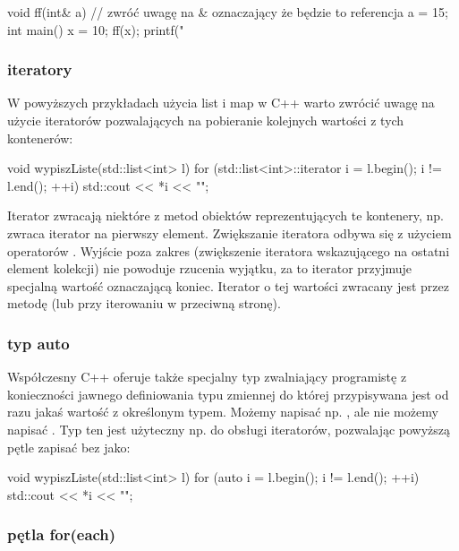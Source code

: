 \begin{CodeFrame*}[cpp]{}
void ff(int& a) { // zwróć uwagę na & oznaczający że będzie to referencja
    a = 15;
}
int main() {
    x = 10;
    ff(x);
    printf("%
}
\end{CodeFrame*}

\subsubsection{iteratory}

W powyższych przykładach użycia list i map w C++ warto zwrócić uwagę na użycie iteratorów pozwalających na pobieranie kolejnych wartości z tych kontenerów:

\begin{CodeFrame*}[cpp]{}
void wypiszListe(std::list<int> l) {
    for (std::list<int>::iterator i = l.begin(); i != l.end(); ++i) {
        std::cout << *i << "\n";
    }
}
\end{CodeFrame*}

Iterator zwracają niektóre z metod obiektów reprezentujących te kontenery, np.  zwraca iterator na pierwszy element.
Zwiększanie iteratora odbywa się z użyciem operatorów \cpp{++}.
Wyjście poza zakres (zwiększenie iteratora wskazującego na ostatni element kolekcji) nie powoduje rzucenia wyjątku, za to iterator przyjmuje specjalną wartość oznaczającą koniec.
Iterator o tej wartości zwracany jest przez metodę  (lub  przy iterowaniu w przeciwną stronę).

\subsubsection{typ auto}

Współczesny C++ oferuje także specjalny typ  zwalniający programistę z konieczności jawnego definiowania typu zmiennej do której przypisywana jest od razu jakaś wartość z określonym typem. Możemy napisać np. , ale nie możemy napisać . Typ ten jest użyteczny np. do obsługi iteratorów, pozwalając powyższą pętle zapisać bez  jako:

\begin{CodeFrame*}[cpp]{}
void wypiszListe(std::list<int> l) {
    for (auto i = l.begin(); i != l.end(); ++i) {
        std::cout << *i << "\n";
    }
}
\end{CodeFrame*}

\subsubsection{pętla for(each)}

